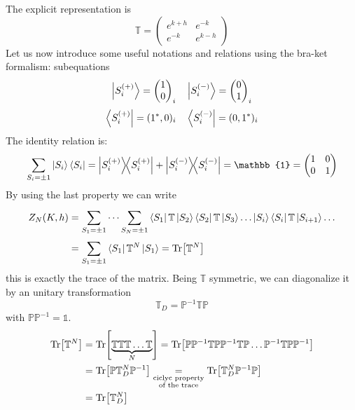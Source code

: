 \documentclass[../main/main.tex]{subfiles}
\begin{document}
The explicit representation is
\begin{equation}
  \mathbb{T} =
\begin{pmatrix}
e^{k+h}    & e^{-k}  \\
  e^{-k}  & e^{k-h}
\end{pmatrix}
\end{equation}
Let us now introduce some useful notations and relations using the bra-ket formalism:
subequations
\begin{equation}
  \ket{S_i^{(+)}} = \begin{pmatrix}
  1 \\
  0
  \end{pmatrix}_i
  \quad
  \ket{S_i^{(-)}} = \begin{pmatrix}
  0 \\
  1
  \end{pmatrix}_i
\end{equation}
\begin{equation}
  \bra{S_i^{(+)}} = (1^*,0)_i \quad   \bra{S_i^{(-)}} = (0,1^*)_i
\end{equation}
The identity relation is:
\begin{equation}
  \sum_{S_i = \pm 1}^{}  \ket{S_i} \bra{S_i} =
  \ketbra{S_i^{(+)}}{S_i^{(+)}} + \ketbra{S_i^{(-)}}{S_i^{(-)}}
  =\mathbb{1} = \begin{pmatrix}
  1   & 0 \\
  0   & 1
  \end{pmatrix}
\end{equation}
By using the last property we can write
\begin{equation}
  \begin{split}
   Z_N (K,h) &= \sum_{S_1 = \pm 1}^{} \dots \sum_{S_N = \pm 1}^{} \bra{S_1} \mathbb{T} \ket{S_2} \bra{S_2}  \mathbb{T} \ket{S_3} \dots \ket{S_i} \bra{S_i}  \mathbb{T} \ket{S_{i+1}} \dots \\
   & = \sum_{S_1 = \pm 1}^{}  \bra{S_1}  \mathbb{T}^N \ket{S_1} = \Tr[\mathbb{T}^N]
     \end{split}
\end{equation}
this is exactly the trace of the matrix. Being \( \mathbb{T} \) symmetric, we can diagonalize it by an unitary transformation
\begin{equation}
   \mathbb{T}_D = \mathbb{P}^{-1} \mathbb{T} \mathbb{P}
\end{equation}
with \( \mathbb{P} \mathbb{P}^{-1} = \mathbb{1} \).
\begin{equation}
\begin{split}
  \Tr[\mathbb{T}^N] &= \Tr[\underbrace{\mathbb{T} \mathbb{T} \mathbb{T} \dots \mathbb{T}}_{N} ] = \Tr[ \mathbb{P} \mathbb{P}^{-1} \mathbb{T} \mathbb{P} \mathbb{P}^{-1} \mathbb{T} \mathbb{P} \dots \mathbb{P}^{-1}  \mathbb{T} \mathbb{P} \mathbb{P}^{-1} ]    \\
  & = \Tr[ \mathbb{P} \mathbb{T}_D^N \mathbb{P}^{-1}] \underset{\substack{ \text{ciclyc property} \\  \text{of the trace} } }{=} \Tr[ \mathbb{T}_D^N \mathbb{P}^{-1} \mathbb{P} ]\\
  & = \Tr[ \mathbb{T}_D^N]
\end{split}
\end{equation}
\end{document}
